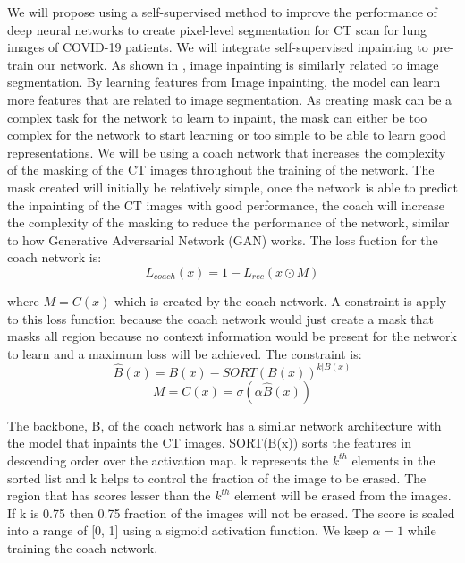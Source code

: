 We will propose using a self-supervised method to improve the performance of deep neural networks to create pixel-level segmentation for CT scan for lung images of COVID-19 patients. We will integrate self-supervised inpainting to pre-train our network. As shown in \cite{ref25}, image inpainting is similarly related to image segmentation. By learning features from Image inpainting, the model can learn more features that are related to image segmentation. As creating mask can be a complex task for the network to learn to inpaint, the mask can either be too complex for the network to start learning or too simple to be able to learn good representations. We will be using a coach network\cite{ref25} that increases the complexity of the masking of the CT images throughout the training of the network. The mask created will initially be relatively simple, once the network is able to predict the inpainting of the CT images with good performance, the coach will increase the complexity of the masking to reduce the performance of the network, similar to how Generative Adversarial Network (GAN) \cite{ref20} works. The loss fuction for the coach network is:
\begin{equation}
L_{coach}(x) = 1 - L_{rec}(x\odot M)
\end{equation}

where $M = C(x)$ which is created by the coach network. A constraint is apply to this loss function because the coach network would just create a mask that masks all region because no context information would be present for the network to learn and a maximum loss will be achieved. The constraint is:
\begin{equation}
\hat{B}(x) = B(x) - SORT(B(x))^{k|B(x)} 
\end{equation}
\begin{equation}
M = C(x) = \sigma (\alpha \hat{B}(x))
\end{equation}

The backbone, B, of the coach network has a similar network architecture with the model that inpaints the CT images. SORT(B(x)) sorts the features in descending order over the activation map. k represents the $k^{th}$ elements in the sorted list and k helps to control the fraction of the image to be erased. The region that has scores lesser than the $k^{th}$ element will be erased from the images. If k is 0.75 then 0.75 fraction of the images will not be erased. The score is scaled into a range of [0, 1] using a sigmoid activation function. We keep $\alpha = 1$ while training the coach network.

